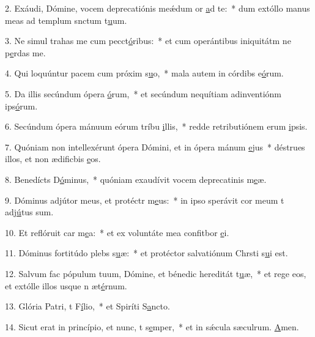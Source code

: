 2. Exáudi, Dómine, vocem deprecatiónis meǽdum or \uline{a}d te:~* dum extóllo manus meas ad templum snctum t\uline{u}um.\par 
3. Ne simul trahas me cum pecct\uline{ó}ribus:~* et cum operántibus iniquitátm ne p\uline{e}rdas me.\par 
4. Qui loquúntur pacem cum próxim s\uline{u}o,~* mala autem in córdibs e\uline{ó}rum.\par 
5. Da illis secúndum ópera \uline{ó}rum,~* et secúndum nequítiam adinventiónm ips\uline{ó}rum.\par 
6. Secúndum ópera mánuum eórum tríbu \uline{i}llis,~* redde retributiónem erum \uline{i}psis.\par 
7. Quóniam non intellexérunt ópera Dómini, et in ópera mánum \uline{e}jus~* déstrues illos, et non ædificbis \uline{e}os.\par 
8. Benedícts D\uline{ó}minus,~* quóniam exaudívit vocem deprecatinis m\uline{e}æ.\par 
9. Dóminus adjútor meus, et protéctr m\uline{e}us:~* in ipso sperávit cor meum t adj\uline{ú}tus sum.\par 
10. Et reflóruit car m\uline{e}a:~* et ex voluntáte mea confitbor \uline{e}i.\par 
11. Dóminus fortitúdo plebs s\uline{u}æ:~* et protéctor salvatiónum Chrsti s\uline{u}i est.\par 
12. Salvum fac pópulum tuum, Dómine, et bénedic hereditát t\uline{u}æ,~* et rege eos, et extólle illos usque n æt\uline{é}rnum.\par 
13. Glória Patri, t F\uline{í}lio,~* et Spiríti S\uline{a}ncto.\par 
14. Sicut erat in princípio, et nunc, t s\uline{e}mper,~* et in sǽcula sæculrum. \uline{A}men.\par 
